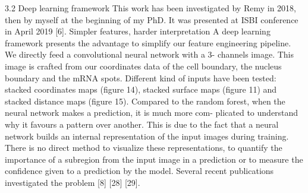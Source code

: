 %

3.2 Deep learning framework
This work has been investigated by Remy in 2018, then by myself at the beginning
of my PhD. It was presented at ISBI conference in April 2019 [6].
Simpler features, harder interpretation A deep learning framework presents the
advantage to simplify our feature engineering pipeline. We directly feed a convolutional
neural network with a 3- channels image. This image is crafted from our coordinates
data of the cell boundary, the nucleus boundary and the mRNA spots. Different kind
of inputs have been tested: stacked coordinates maps
(figure 14), stacked surface maps (figure 11) and stacked distance maps (figure 15).
Compared to the random forest, when the neural network makes a prediction, it is
much more com- plicated to understand why it favours a pattern over another.
This is due to the fact that a neural
network builds an internal representation of the input images during training.
There is no direct method to visualize these representations, to quantify the
importance of a subregion from the input image in a prediction or to measure
the confidence given to a prediction by the model. Several recent publications
investigated the problem [8] [28] [29].

